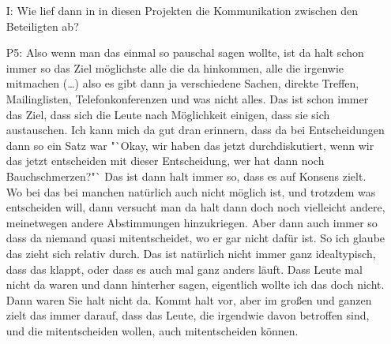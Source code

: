 \begin{itemize}
    \item[I:] Wie lief dann in in diesen Projekten die Kommunikation zwischen den Beteiligten ab?
    \item[P5:] Also wenn man das einmal so pauschal sagen wollte, ist da halt schon immer so das Ziel m{\"o}glichste alle die da hinkommen, alle die irgenwie mitmachen (\dots) also es gibt dann ja verschiedene Sachen, direkte Treffen, Mailinglisten, Telefonkonferenzen und was nicht alles. Das ist schon immer das Ziel, dass sich die Leute nach M{\"o}glichkeit einigen, dass sie sich austauschen. Ich kann mich da gut dran erinnern, dass da bei Entscheidungen dann so ein Satz war "`Okay, wir haben das jetzt durchdiskutiert, wenn wir das jetzt entscheiden mit dieser Entscheidung, wer hat dann noch Bauchschmerzen?"` Das ist dann halt immer so, dass es auf Konsens zielt. Wo bei das bei manchen nat{\"u}rlich auch nicht m{\"o}glich ist, und trotzdem was entscheiden will, dann versucht man da halt dann doch noch vielleicht andere, meinetwegen andere Abstimmungen hinzukriegen. Aber dann auch immer so dass da niemand quasi mitentscheidet, wo er gar nicht daf{\"u}r ist. So ich glaube das zieht sich relativ durch. Das ist nat{\"u}rlich nicht immer ganz idealtypisch, dass das klappt, oder dass es auch mal ganz anders l{\"a}uft. Dass Leute mal nicht da waren und dann hinterher sagen, eigentlich wollte ich das doch nicht. Dann waren Sie halt nicht da. Kommt halt vor, aber im gro{\ss}en und ganzen zielt das immer darauf, dass das Leute, die irgendwie davon betroffen sind, und die mitentscheiden wollen, auch mitentscheiden k{\"o}nnen. 
\end{itemize}

